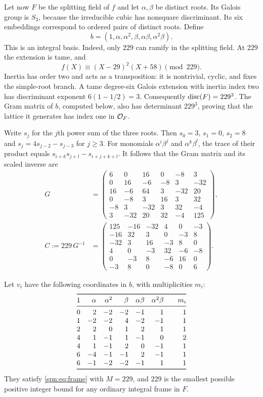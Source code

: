 Let now $F$ be the splitting field of $f$ and let $\alpha,\beta$ be distinct
roots. Its Galois group is $S_3$, because the irreducible cubic has nonsquare
discriminant. Its six embeddings correspond to ordered pairs of distinct
roots. Define
\[
 b=(1,\alpha,\alpha^2,\beta,\alpha\beta,\alpha^2\beta).
\]
This is an integral basis. Indeed, only $229$ can ramify in the splitting
field. At $229$ the extension is tame, and
\[
 f(X)\equiv(X-29)^2(X+58)\pmod{229}.
\]
Inertia has order two and acts as a transposition: it is nontrivial, cyclic,
and fixes the simple-root branch. A tame degree-six Galois extension with
inertia index two has discriminant exponent $6(1-1/2)=3$. Consequently
$\operatorname{disc}(F)=229^3$. The Gram matrix of $b$, computed below, also has determinant
$229^3$, proving that the lattice it generates has index one in $\mathcal{O}_F$.

Write $s_j$ for the $j$th power sum of the three roots. Then $s_0=3$, $s_1=0$,
$s_2=8$ and $s_j=4s_{j-2}-s_{j-3}$ for $j\ge3$. For monomials
$\alpha^i\beta^j$ and $\alpha^k\beta^l$, the trace of their product equals
$s_{i+k}s_{j+l}-s_{i+j+k+l}$. It follows that the Gram matrix and its scaled
inverse are
\begin{align*}
G&=\begin{pmatrix}
6&0&16&0&-8&3\\
0&16&-6&-8&3&-32\\
16&-6&64&3&-32&20\\
0&-8&3&16&3&32\\
-8&3&-32&3&32&-4\\
3&-32&20&32&-4&125
\end{pmatrix},\\[3pt]
C:=229\,G^{-1}&=\begin{pmatrix}
125&-16&-32&4&0&-3\\
-16&32&3&0&-3&8\\
-32&3&16&-3&8&0\\
4&0&-3&32&-6&-8\\
0&-3&8&-6&16&0\\
-3&8&0&-8&0&6
\end{pmatrix}.
\end{align*}

\begin{theorem}\label{spn:thm:optimal229}
Let $v_i$ have the following coordinates in $b$, with multiplicities $m_i$:
\[
\begin{array}{@{}rrrrrrcr@{}}
\toprule
1&\alpha&\alpha^2&\beta&\alpha\beta&\alpha^2\beta&&m_i\\\midrule
0&2&-2&-2&-1&1&&1\\
1&-2&-2&4&-2&-1&&1\\
2&2&0&1&2&1&&1\\
4&1&-1&1&-1&0&&2\\
4&1&-1&2&0&-1&&1\\
6&-4&-1&-1&2&-1&&1\\
6&-1&-2&-2&-1&1&&1\\\bottomrule
\end{array}
\]
They satisfy \eqref{spn:eq:frame} with $M=229$, and $229$ is the smallest
possible positive integer bound for any ordinary integral frame in $F$.
\end{theorem}

